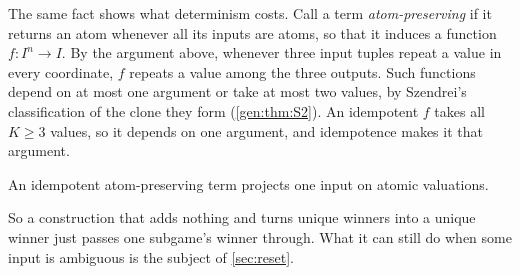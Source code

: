 The same fact shows what determinism costs. Call a term \emph{atom-preserving} if it returns an atom whenever all its inputs are atoms, so that it induces a function $f:I^n\to I$. By the argument above, whenever three input tuples repeat a value in every coordinate, $f$ repeats a value among the three outputs. Such functions depend on at most one argument or take at most two values, by Szendrei's classification of the clone they form \cite{Szendrei2012} (\cref{gen:thm:S2}). An idempotent $f$ takes all $K\geq3$ values, so it depends on one argument, and idempotence makes it that argument.

\begin{corollary}[Determinacy]\label{gen:cor:determinacy}
An idempotent atom-preserving term projects one input on atomic valuations.
\end{corollary}

So a construction that adds nothing and turns unique winners into a unique winner just passes one subgame's winner through. What it can still do when some input is ambiguous is the subject of \cref{sec:reset}.
